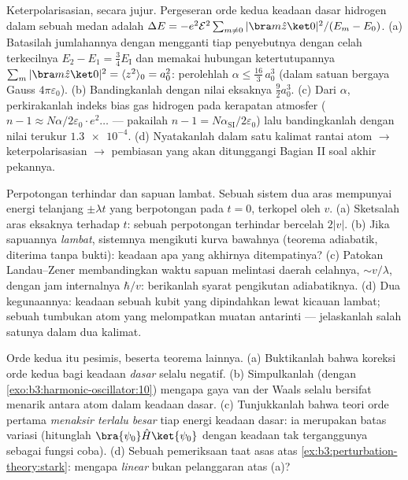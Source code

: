 \begin{exercise}[$\star\star\star$]\label{exo:b3:perturbation-theory:10}
Keterpolarisasian, secara jujur. Pergeseran orde kedua keadaan dasar
hidrogen dalam sebuah medan adalah $\Delta E = -e^2\mathcal E^2\sum_{m\neq
0}|\bra m\hat z\ket 0|^2/(E_m - E_0)$. (a) Batasilah jumlahannya dengan
mengganti tiap penyebutnya dengan celah terkecilnya $E_2 - E_1 =
\tfrac34 E_{\text{I}}$ dan memakai hubungan ketertutupannya $\sum_m|\bra
m\hat z\ket0|^2 = \langle z^2\rangle_0 = a_0^2$: perolehlah $\alpha
\le \tfrac{16}3\,a_0^3$ (dalam satuan bergaya Gauss
$4\pi\varepsilon_0$). (b) Bandingkanlah dengan nilai eksaknya $\tfrac92 a_0^3$.
(c) Dari $\alpha$, perkirakanlah indeks bias gas hidrogen
pada kerapatan atmosfer ($n - 1 \approx N\alpha/2\varepsilon_0
\cdot e^2\dots$ --- pakailah $n - 1 = N\alpha_{\text{SI}}/2
\varepsilon_0$) lalu bandingkanlah dengan nilai terukur $\num{1.3e-4}$.
(d) Nyatakanlah dalam satu kalimat rantai atom $\to$ keterpolarisasian
$\to$ pembiasan yang akan ditunggangi Bagian II soal akhir pekannya.
\end{exercise}

\begin{exercise}[$\star\star\star$]\label{exo:b3:perturbation-theory:11}
Perpotongan terhindar dan sapuan lambat. Sebuah sistem dua aras
mempunyai energi telanjang $\pm\lambda t$ yang berpotongan pada
$t = 0$, terkopel oleh $v$. (a)
Sketsalah aras eksaknya terhadap $t$: sebuah perpotongan terhindar
bercelah $2|v|$. (b) Jika sapuannya \emph{lambat}, sistemnya mengikuti
kurva bawahnya (teorema adiabatik, diterima tanpa bukti): keadaan apa
yang akhirnya ditempatinya? (c) Patokan Landau--Zener membandingkan
waktu sapuan melintasi daerah celahnya, $\sim v/\lambda$, dengan jam
internalnya $\hbar/v$: berikanlah syarat pengikutan adiabatiknya. (d)
Dua kegunaannya: keadaan sebuah kubit yang dipindahkan lewat kicauan
lambat; sebuah tumbukan atom yang melompatkan muatan antarinti ---
jelaskanlah salah satunya dalam dua kalimat.
\end{exercise}

\begin{exercise}[$\star\star\star$]\label{exo:b3:perturbation-theory:12}
Orde kedua itu pesimis, beserta teorema lainnya. (a) Buktikanlah bahwa
koreksi orde kedua bagi keadaan \emph{dasar} selalu negatif. (b)
Simpulkanlah (dengan \cref{exo:b3:harmonic-oscillator:10}) mengapa gaya
van der Waals selalu bersifat menarik antara atom dalam keadaan dasar.
(c) Tunjukkanlah bahwa teori orde pertama \emph{menaksir terlalu besar}
tiap energi keadaan dasar: ia merupakan batas variasi (hitunglah $\bra{\psi_0}\hat
H\ket{\psi_0}$ dengan keadaan tak terganggunya sebagai
fungsi coba). (d) Sebuah pemeriksaan taat asas atas
\cref{ex:b3:perturbation-theory:stark}: mengapa  \emph{linear}
bukan pelanggaran atas (a)?
\end{exercise}

